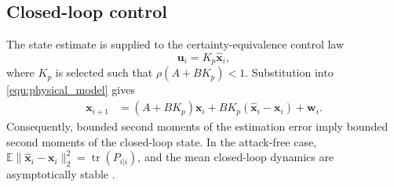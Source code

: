 \subsection{Closed-loop control}
The state estimate is supplied to the certainty-equivalence control law
\begin{equation}\label{equ:controller}
\mathbf{u}_i = K_p\hat{\mathbf{x}}_i,
\end{equation}
where $K_p$ is selected such that $\rho(A+BK_p)<1$. Substitution into \eqref{equ:physical_model} gives
\begin{align*}
\mathbf{x}_{i+1}
&=\left(A+BK_p\right)\mathbf{x}_i+BK_p\left(\hat{\mathbf{x}}_i-\mathbf{x}_i\right)+\mathbf{w}_i.
\end{align*}
Consequently, bounded second moments of the estimation error imply bounded second moments of the closed-loop state. In the attack-free case, $\mathbb{E}\|\hat{\mathbf{x}}_i-\mathbf{x}_i\|_2^2=\operatorname{tr}(P_{i|i})$, and the mean closed-loop dynamics are asymptotically stable \cite{anderson2012optimal,rawlings2017model}.
